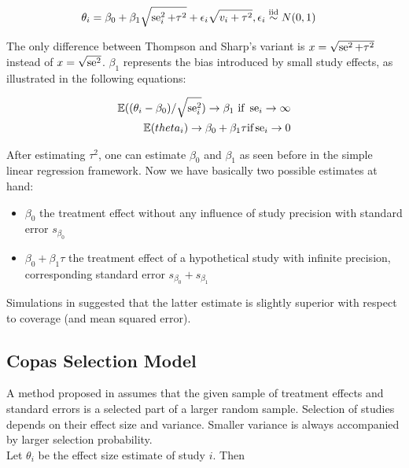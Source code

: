 \documentclass[11pt,a4paper,twoside]{book}\usepackage[]{graphicx}\usepackage[]{color}
\begin{document}
\begin{align}
\theta_i & = \beta_0 + \beta_1\sqrt{\se_i^2 + \tau^2} + \epsilon_i\sqrt{v_i + \tau^2}, \epsilon_i \stackrel{\textrm{iid}}{\sim} N(0,1)  \label{eq:limitmeta.regression}
\end{align}

The only difference between Thompson and Sharp's variant is $x = \sqrt{\operatorname{se}^2 + \tau^2}$ instead of $x = \sqrt{\operatorname{se}^2}$. $\beta_{1}$ represents the bias introduced by small study effects, as illustrated in the following equations:

\begin{align}
\mathbb{E}((\theta_i - \beta_0)/\sqrt{\se_i^2}) \rightarrow \beta_1 \textrm{ if } \se_i \rightarrow \infty \nonumber \\ %
\mathbb{E}(theta_i) \rightarrow \beta_0 + \beta_1 \tau \textrm{if} \se_i \rightarrow 0 \nonumber
\end{align}

After estimating $\tau^2$, one can estimate $\beta_{0}$ and $\beta_{1}$ as seen before in the simple linear regression framework. Now we have basically two possible estimates at hand:
\begin{itemize}
\item $\beta_0$ the treatment effect without any influence of study precision with standard error $s_{\beta_0}$
\item $\beta_0 + \beta_1 \tau$ the treatment effect of a hypothetical study with infinite precision, corresponding standard error $s_{\beta_0} + s_{\beta_1}$
\end{itemize}

Simulations in \citet{limitmeta} suggested that the latter estimate is slightly superior with respect to coverage (and mean squared error).



\subsection{Copas Selection Model} \label{sec:copas}

A method proposed in \cite{Copas1,Copas2,Copas3} 
assumes that the given sample of treatment effects and standard errors is a selected part of a larger random sample. Selection of studies depends on their effect size and variance. Smaller variance is always accompanied by larger selection probability. \\
Let $\theta_i$ be the effect size estimate of study $i$. Then 
\end{document}
